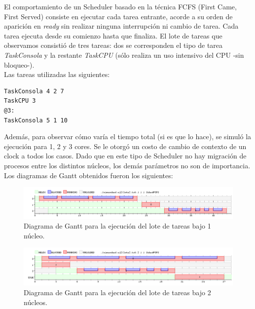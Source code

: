 \documentclass[a4paper]{article}
\begin{document}
El comportamiento de un Scheduler basado en la t\'ecnica FCFS (First Came, First Served) consiste en ejecutar cada tarea entrante, acorde a su orden de aparici\'on en \textit{ready} sin realizar ninguna interrupci\'on ni cambio de tarea. Cada tarea ejecuta desde su comienzo hasta que finaliza. El lote de tareas que observamos consisti\'o de tres tareas: dos se corresponden el tipo de tarea \textit{TaskConsola} y la restante \textit{TaskCPU} (s\'olo realiza un uso intensivo del CPU -sin bloqueo-). \\

Las tareas utilizadas las siguientes:


	\begin{codesnippet}
	\begin{verbatim}
TaskConsola 4 2 7
TaskCPU 3
@3:
TaskConsola 5 1 10
	\end{verbatim}
	\end{codesnippet}
	
Además, para observar c\'omo varía el tiempo total (si es que lo hace), se simuló la ejecución para 1, 2 y 3 cores. Se le otorg\'o un costo de cambio de contexto de un clock a todos los casos. Dado que en este tipo de Scheduler no hay migración de procesos entre los distintos núcleos, los dem\'as par\'ametros no son de importancia.\\

Los diagramas de Gantt obtenidos fueron los siguientes:\\

 \begin{figure}[h!]
   \begin{center}
 	\includegraphics[scale=0.5]{imagenes/ej2/1core.png}
 	\caption{Diagrama de Gantt para la ejecuci\'on del lote de tareas bajo 1 n\'ucleo.}
   \end{center}
 \end{figure} 
 

 \begin{figure}[h!]
   \begin{center}
 	\includegraphics[scale=0.5]{imagenes/ej2/2core.png}
 	\caption{Diagrama de Gantt para la ejecuci\'on del lote de tareas bajo 2 n\'ucleos.}
   \end{center}
 \end{figure} 
 
\end{document}
